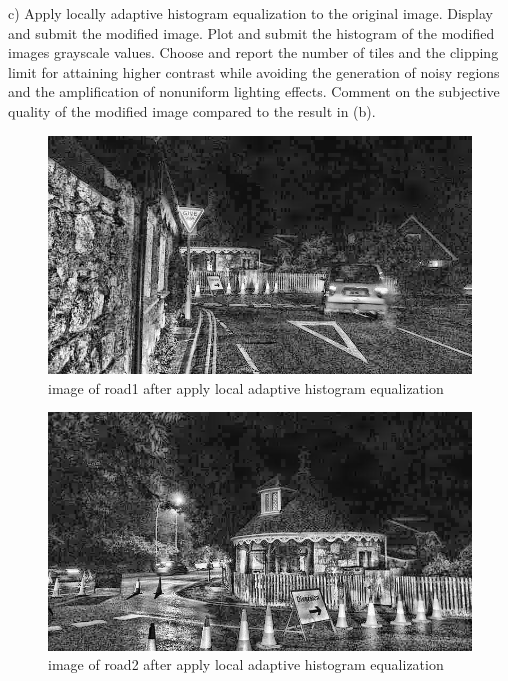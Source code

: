 \documentclass[
	12pt, %
]{fphw}
\begin{document}
\begin{problem}
	c)  Apply locally adaptive histogram equalization to the original image. Display
	and submit the modified image. Plot and submit the histogram of the modified images grayscale values. Choose
	and report the number of tiles and the clipping limit for attaining higher contrast while avoiding the generation
	of noisy regions and the amplification of nonuniform lighting effects. Comment on the subjective quality of the
	modified image compared to the result in (b).
\end{problem}
\begin{figure}[H]
 
	\centering
	\includegraphics[width=1\columnwidth]{T2/result/I1_local.jpg} 
	\caption{image of road1 after apply local adaptive histogram equalization}
	\label{fig16}
\end{figure}
\begin{figure}[H]
 
	\centering
	\includegraphics[width=1\columnwidth]{T2/result/I2_local.jpg} 
	\caption{image of road2 after apply local adaptive histogram equalization}
	\label{fig17}
\end{figure}
\end{document}
